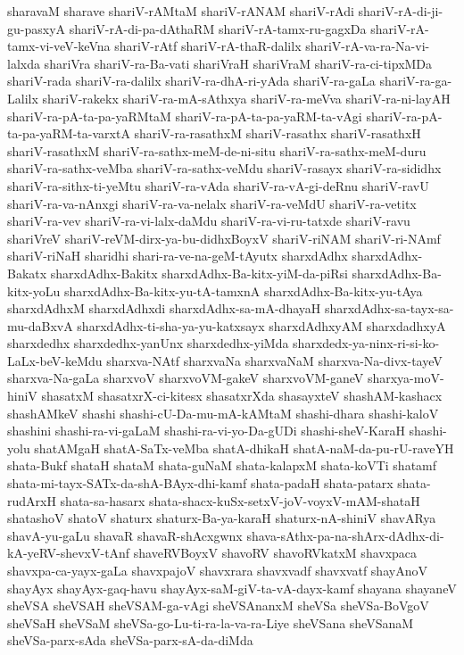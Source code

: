 {sharavaM
sharave
shariV-rAMtaM
shariV-rANAM
shariV-rAdi
shariV-rA-di-ji-gu-pasxyA
shariV-rA-di-pa-dAthaRM
shariV-rA-tamx-ru-gagxDa
shariV-rA-tamx-vi-veV-keVna
shariV-rAtf
shariV-rA-thaR-dalilx
shariV-rA-va-ra-Na-vi-lalxda
shariVra
shariV-ra-Ba-vati
shariVraH
shariVraM
shariV-ra-ci-tipxMDa
shariV-rada
shariV-ra-dalilx
shariV-ra-dhA-ri-yAda
shariV-ra-gaLa
shariV-ra-ga-Lalilx
shariV-rakekx
shariV-ra-mA-sAthxya
shariV-ra-meVva
shariV-ra-ni-layAH
shariV-ra-pA-ta-pa-yaRMtaM
shariV-ra-pA-ta-pa-yaRM-ta-vAgi
shariV-ra-pA-ta-pa-yaRM-ta-varxtA
shariV-ra-rasathxM
shariV-rasathx
shariV-rasathxH
shariV-rasathxM
shariV-ra-sathx-meM-de-ni-situ
shariV-ra-sathx-meM-duru
shariV-ra-sathx-veMba
shariV-ra-sathx-veMdu
shariV-rasayx
shariV-ra-sididhx
shariV-ra-sithx-ti-yeMtu
shariV-ra-vAda
shariV-ra-vA-gi-deRnu
shariV-ravU
shariV-ra-va-nAnxgi
shariV-ra-va-nelalx
shariV-ra-veMdU
shariV-ra-vetitx
shariV-ra-vev
shariV-ra-vi-lalx-daMdu
shariV-ra-vi-ru-tatxde
shariV-ravu
shariVreV
shariV-reVM-dirx-ya-bu-didhxBoyxV
shariV-riNAM
shariV-ri-NAmf
shariV-riNaH
sharidhi
shari-ra-ve-na-geM-tAyutx
sharxdAdhx
sharxdAdhx-Bakatx
sharxdAdhx-Bakitx
sharxdAdhx-Ba-kitx-yiM-da-piRsi
sharxdAdhx-Ba-kitx-yoLu
sharxdAdhx-Ba-kitx-yu-tA-tamxnA
sharxdAdhx-Ba-kitx-yu-tAya
sharxdAdhxM
sharxdAdhxdi
sharxdAdhx-sa-mA-dhayaH
sharxdAdhx-sa-tayx-sa-mu-daBxvA
sharxdAdhx-ti-sha-ya-yu-katxsayx
sharxdAdhxyAM
sharxdadhxyA
sharxdedhx
sharxdedhx-yanUnx
sharxdedhx-yiMda
sharxdedx-ya-ninx-ri-si-ko-LaLx-beV-keMdu
sharxva-NAtf
sharxvaNa
sharxvaNaM
sharxva-Na-divx-tayeV
sharxva-Na-gaLa
sharxvoV
sharxvoVM-gakeV
sharxvoVM-ganeV
sharxya-moV-hiniV
shasatxM
shasatxrX-ci-kitesx
shasatxrXda
shasayxteV
shashAM-kashacx
shashAMkeV
shashi
shashi-cU-Da-mu-mA-kAMtaM
shashi-dhara
shashi-kaloV
shashini
shashi-ra-vi-gaLaM
shashi-ra-vi-yo-Da-gUDi
shashi-sheV-KaraH
shashi-yolu
shatAMgaH
shatA-SaTx-veMba
shatA-dhikaH
shatA-naM-da-pu-rU-raveYH
shata-Bukf
shataH
shataM
shata-guNaM
shata-kalapxM
shata-koVTi
shatamf
shata-mi-tayx-SATx-da-shA-BAyx-dhi-kamf
shata-padaH
shata-patarx
shata-rudArxH
shata-sa-hasarx
shata-shacx-kuSx-setxV-joV-voyxV-mAM-shataH
shatashoV
shatoV
shaturx
shaturx-Ba-ya-karaH
shaturx-nA-shiniV
shavARya
shavA-yu-gaLu
shavaR
shavaR-shAcxgwnx
shava-sAthx-pa-na-shArx-dAdhx-di-kA-yeRV-shevxV-tAnf
shaveRVBoyxV
shavoRV
shavoRVkatxM
shavxpaca
shavxpa-ca-yayx-gaLa
shavxpajoV
shavxrara
shavxvadf
shavxvatf
shayAnoV
shayAyx
shayAyx-gaq-havu
shayAyx-saM-giV-ta-vA-dayx-kamf
shayana
shayaneV
sheVSA
sheVSAH
sheVSAM-ga-vAgi
sheVSAnanxM
sheVSa
sheVSa-BoVgoV
sheVSaH
sheVSaM
sheVSa-go-Lu-ti-ra-la-va-ra-Liye
sheVSana
sheVSanaM
sheVSa-parx-sAda
sheVSa-parx-sA-da-diMda
}
